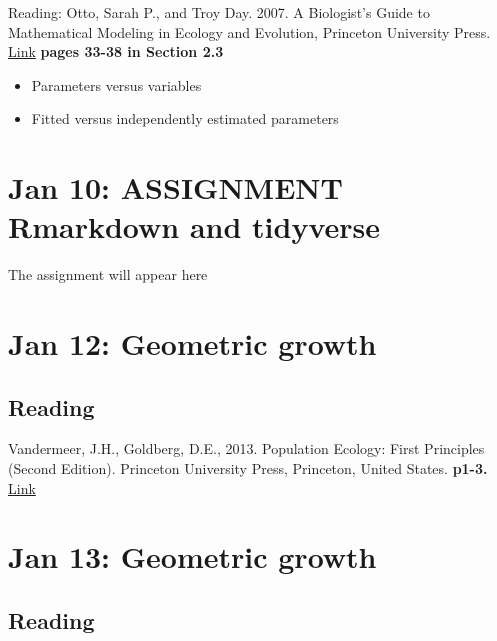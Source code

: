 \documentclass[
]{book}
\providecommand{\tightlist}{%
  \setlength{\itemsep}{0pt}\setlength{\parskip}{0pt}}
\begin{document}
Reading: Otto, Sarah P., and Troy Day. 2007. A Biologist's Guide to Mathematical Modeling in Ecology and Evolution, Princeton University Press. \href{https://ebookcentral-proquest-com.qe2a-proxy.mun.ca/lib/mun/detail.action?docID=768551}{Link} \textbf{pages 33-38 in Section 2.3}

\begin{itemize}
\tightlist
\item
  Parameters versus variables
\item
  Fitted versus independently estimated parameters
\end{itemize}

\hypertarget{jan-10-assignment-rmarkdown-and-tidyverse}{%
\chapter{\texorpdfstring{Jan 10: \textbf{ASSIGNMENT} Rmarkdown and tidyverse}{Jan 10: ASSIGNMENT Rmarkdown and tidyverse}}\label{jan-10-assignment-rmarkdown-and-tidyverse}}

The assignment will appear here

\hypertarget{jan-12-geometric-growth}{%
\chapter{Jan 12: Geometric growth}\label{jan-12-geometric-growth}}

\hypertarget{reading}{%
\section{Reading}\label{reading}}

Vandermeer, J.H., Goldberg, D.E., 2013. Population Ecology: First Principles (Second Edition). Princeton University Press, Princeton, United States. \textbf{p1-3.} \href{https://ebookcentral-proquest-com.qe2a-proxy.mun.ca/lib/mun/detail.action?docID=1205619}{Link}

\hypertarget{jan-13-geometric-growth}{%
\chapter{Jan 13: Geometric growth}\label{jan-13-geometric-growth}}

\hypertarget{reading-1}{%
\section{Reading}\label{reading-1}}
\end{document}

